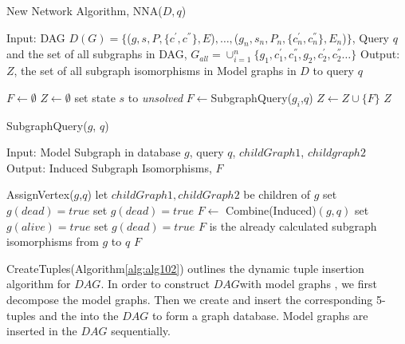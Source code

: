 \begin{algorithm}
\caption{New Network Algorithm, NNA($D , q$)}
\label{alg:alg105}
\begin{algorithmic}
\STATE Input: DAG $D(G)= \{$($g,s,P,\{c^{'},c^{''}\},E$)$,\ldots,$($g_n,s_n,P_n,\{c_n^{'},c_n^{''}\},E_n$)$ \}$, Query $q$
\STATE and the set of all subgraphs in DAG, $G_{all} = \cup_{i=1}^n \{g_1 ,c_1^{'},c_1^{''},g_2 ,c_2^{'},c_2^{''}\ldots \}$ 
\STATE Output: $Z$, the set of all subgraph isomorphisms in Model graphs in $D$ to query $q$ 
\end{algorithmic}
\begin{algorithmic}[1]
\STATE $F \leftarrow \emptyset$
\STATE $Z \leftarrow \emptyset$
  \STATE set state $s$ to \textit{unsolved}
\ENDFOR
{}
   \STATE $F \leftarrow $SubgraphQuery($g_i$,$q$)
      \STATE $Z \leftarrow Z \cup \{F\}$
   \ENDIF
\ENDFOR
\RETURN $Z$
\end{algorithmic}
\end{algorithm}


\begin{algorithm}
\caption{SubgraphQuery($g$, $q$)}
\label{alg:alg106}
\begin{algorithmic}
\STATE Input: Model Subgraph in database  $g$, query $q$, $childGraph1$, $childgraph2$
\STATE Output: Induced Subgraph Isomorphisms, $F$
\end{algorithmic}
\begin{algorithmic}[1]
        \STATE AssignVertex($g$,$q$)
      \ELSE 
         \STATE let $childGraph1,childGraph2$ be children of $g$
          \STATE set $g(dead)=true$
			\STATE set $g(dead)=true$
		\ELSE
			\STATE $F \leftarrow$ Combine(Induced)$(g,q)$
		\ENDIF
	\ENDIF
		\STATE set $g(alive)=true$
	\ELSE
		\STATE set  $g(dead)=true$
	\ENDIF
\ELSE
	\STATE $F$ is the already calculated subgraph isomorphisms from $g$ to $q$
\ENDIF
\RETURN $F$
          
\end{algorithmic}
\end{algorithm}


CreateTuples(Algorithm\ref{alg:alg102}) outlines the dynamic tuple insertion algorithm for $DAG$. In order to construct $DAG$with model graphs , we first decompose the model graphs. Then we create and insert the corresponding 5-tuples and the into the $DAG$ to form a graph database. Model graphs are inserted in the $DAG$ sequentially.

